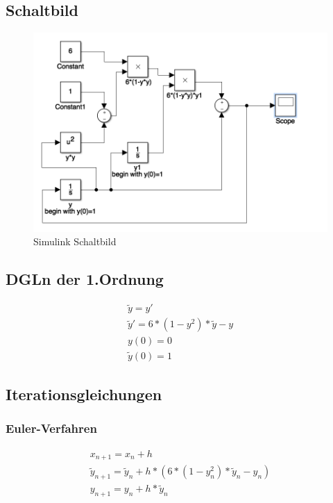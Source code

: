 \documentclass[]{scrartcl}
\begin{document}
\subsection{Schaltbild}

\begin{figure}[htbp]
	\centering
	\includegraphics[width=1\linewidth]{a1_2_schaltbild}
	\caption{Simulink Schaltbild}
	\label{fig:a1_2_schaltbild}
\end{figure}

\subsection{DGLn der 1.Ordnung}
\begin{align}
\tilde{y} = y' \\
\tilde{y}' = 6 * (1 - y^{2}) * \tilde{y} - y \\
y(0)  = 0 \\
\tilde{y}(0) = 1
\end{align}

\subsection{Iterationsgleichungen}

\subsubsection{Euler-Verfahren}
\begin{align}
x_{n+1} = x_{n}+h \\
\tilde{y}_{n+1} = \tilde{y}_{n}+h*(6 * (1 - y_{n}^{2}) * \tilde{y}_{n} - y_{n}) \\
y_{n+1} = y_{n} + h * \tilde{y}_{n}
\end{align}
\end{document}
